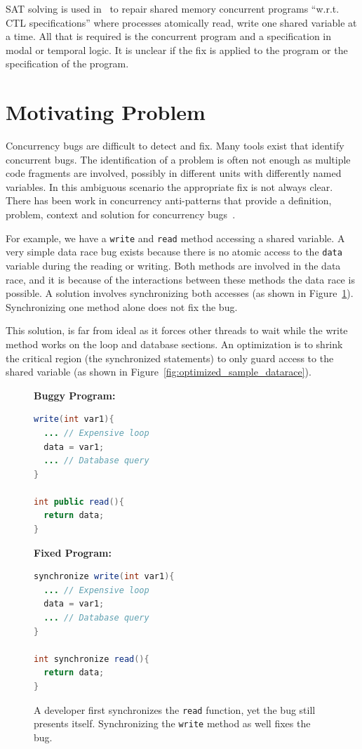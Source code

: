 \documentclass[10pt, conference, compsocconf]{IEEEtran}
\begin{document}
SAT solving is used in~\cite{AY07}  to repair shared memory concurrent programs
``w.r.t. CTL specifications'' where processes atomically read, write one shared
variable at a time. All that is required is the concurrent program and a
specification in modal or temporal logic. It is unclear if the fix is applied
to the program or the specification of the program.

\section{Motivating Problem}
\label{sec:motivation}

Concurrency bugs are difficult to detect and fix. Many
tools exist that identify concurrent bugs. The identification of a problem is
often not enough as multiple code fragments are involved, possibly in different
units with differently named variables. In this ambiguous scenario the 
appropriate fix is not always clear. There has been work in concurrency 
anti-patterns that provide a definition, problem, context and solution for 
concurrency bugs~\cite{BJ09}.

For example, we have a \texttt{write} and \texttt{read} method accessing a
shared variable. A very simple data race bug exists because there is no atomic
access to the \texttt{data} variable during the reading or writing. Both
methods are involved in the data race, and it is because of the interactions 
between these methods the data race is possible. A solution involves 
synchronizing both accesses (as shown in Figure~\ref{fig:fixed_sample_datarace}). 
Synchronizing one method alone does not fix the bug.

This solution, is far from ideal as it forces other threads to wait while the
write method works on the loop and database sections. An optimization is to
shrink the critical region (the synchronized statements) to only guard access
to the shared variable (as shown in
Figure~\ref{fig:optimized_sample_datarace}).

\begin{figure}[!h]
\vspace{2mm}
\begin{minipage}{3.70cm}
\footnotesize{\textbf{Buggy Program:}}
\begin{lstlisting}[language=Java]
write(int var1){
  ... // Expensive loop
  data = var1;
  ... // Database query
}

int public read(){
  return data;
}
\end{lstlisting}
\end{minipage}\hfill
\begin{minipage}{3.70cm}
\footnotesize{\textbf{Fixed Program:}}
\begin{lstlisting}[language=Java]
synchronize write(int var1){
  ... // Expensive loop
  data = var1;
  ... // Database query
}

int synchronize read(){
  return data;
}
\end{lstlisting}
\end{minipage}
\caption{A developer first synchronizes the \texttt{read} function, yet the bug
still presents itself. Synchronizing the \texttt{write} method as well fixes
the bug.}
\label{fig:fixed_sample_datarace}
\end{figure}
\end{document}
